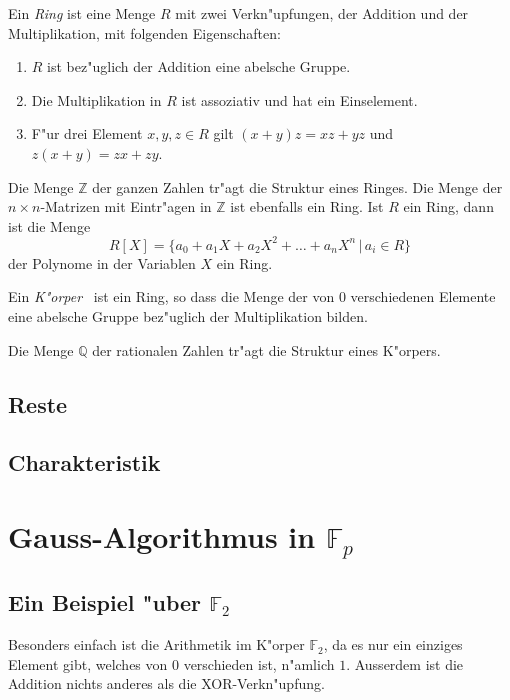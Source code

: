 Ein {\em Ring} ist eine Menge $R$ mit zwei Verkn"upfungen, der Addition
und der Multiplikation, mit folgenden Eigenschaften:
\begin{enumerate}[label={\bf R.\arabic*},itemsep=0mm]
\item $R$ ist bez"uglich der Addition eine abelsche Gruppe.
\item Die Multiplikation in $R$ ist assoziativ und hat ein Einselement.
\item F"ur drei Element $x,y,z\in R$ gilt $(x+y)z=xz+yz$ und
$z(x+y)=zx+zy$.
\end{enumerate}

Die Menge $\mathbb Z$ der ganzen Zahlen tr"agt die Struktur eines Ringes.
Die Menge der $n\times n$-Matrizen mit Eintr"agen in $\mathbb Z$ ist ebenfalls
ein Ring.
Ist $R$ ein Ring, dann ist die Menge 
\[
R[X]=\{ a_0+a_1X +a_2X^2+\dots +a_nX^n\,|\,a_i\in R\}
\]
der Polynome in der Variablen $X$ ein Ring.

Ein {\em K"orper}  ist ein Ring, so dass die Menge der von $0$ verschiedenen
Elemente eine abelsche Gruppe bez"uglich der Multiplikation bilden.

Die Menge $\mathbb Q$ der rationalen Zahlen tr"agt die Struktur eines
K"orpers.

\subsection{Reste}

\subsection{Charakteristik}

\section{Gauss-Algorithmus in $\mathbb F_p$}

\subsection{Ein Beispiel "uber $\mathbb F_2$}
Besonders einfach ist die Arithmetik im K"orper $\mathbb F_2$,
da es nur ein einziges Element gibt, welches von $0$ verschieden ist,
n"amlich $1$.
Ausserdem ist die Addition nichts anderes als die XOR-Verkn"upfung.

